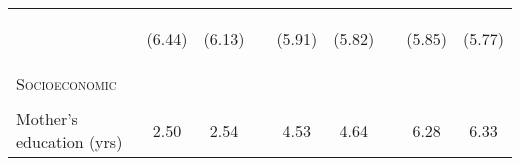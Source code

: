 \documentclass{article}[11pt,subeqn]
\begin{document}
\begin{spacing}{1.5}
\begin{table}[ht]
\begin{center}
\begin{tabular}{lccp{5mm}ccp{5mm}cc}
\begin{footnotesize}\end{footnotesize}	& \begin{footnotesize} (6.44)\end{footnotesize} & \begin{footnotesize} (6.13)\end{footnotesize} & \begin{footnotesize} 	\end{footnotesize} & \begin{footnotesize} (5.91)\end{footnotesize} & \begin{footnotesize} (5.82)\end{footnotesize} & \begin{footnotesize} 	\end{footnotesize} & \begin{footnotesize} (5.85)\end{footnotesize} & \begin{footnotesize} (5.77)\end{footnotesize}	\\
\textsc{Socioeconomic} & & &&&&&& \\																
\begin{footnotesize}\end{footnotesize}	&	\begin{footnotesize}\end{footnotesize}	&	\begin{footnotesize}\end{footnotesize}	&	\begin{footnotesize}\end{footnotesize} &	\begin{footnotesize}\end{footnotesize}	&	\begin{footnotesize}\end{footnotesize}	&	\begin{footnotesize}\end{footnotesize} &	\begin{footnotesize}\end{footnotesize}	&	\begin{footnotesize}\end{footnotesize}		\\
Mother's education (yrs)	&	2.50	&	2.54	&	&	4.53	&	4.64	&	&	6.28	&	6.33		\\

\end{tabular}
\end{center}
\end{table}
\end{spacing}
\end{document}
